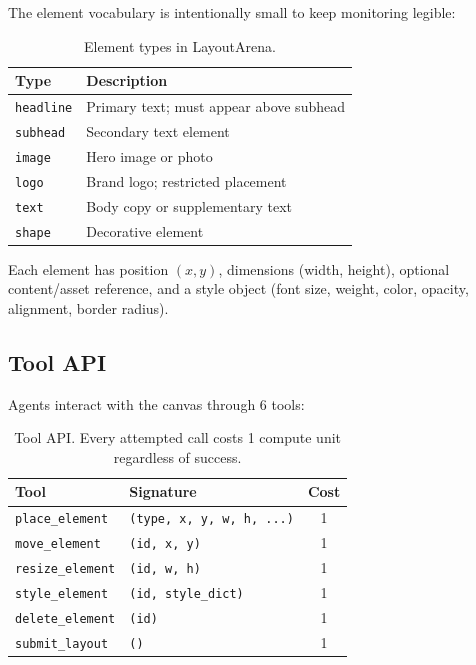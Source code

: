 \documentclass[10pt,twocolumn]{article}
\begin{document}
The element vocabulary is intentionally small to keep monitoring legible:

\begin{table}[H]
\centering
\small
\begin{tabular}{@{}ll@{}}
\toprule
\textbf{Type} & \textbf{Description} \\
\midrule
\texttt{headline} & Primary text; must appear above subhead \\
\texttt{subhead} & Secondary text element \\
\texttt{image} & Hero image or photo \\
\texttt{logo} & Brand logo; restricted placement \\
\texttt{text} & Body copy or supplementary text \\
\texttt{shape} & Decorative element \\
\bottomrule
\end{tabular}
\caption{Element types in LayoutArena.}
\label{tab:elements}
\end{table}

Each element has position $(x, y)$, dimensions (width, height), optional content/asset reference, and a style object (font size, weight, color, opacity, alignment, border radius).

\subsection{Tool API}

Agents interact with the canvas through 6 tools:

\begin{table}[H]
\centering
\small
\begin{tabular}{@{}llc@{}}
\toprule
\textbf{Tool} & \textbf{Signature} & \textbf{Cost} \\
\midrule
\texttt{place\_element} & \texttt{(type, x, y, w, h, ...)} & 1 \\
\texttt{move\_element} & \texttt{(id, x, y)} & 1 \\
\texttt{resize\_element} & \texttt{(id, w, h)} & 1 \\
\texttt{style\_element} & \texttt{(id, style\_dict)} & 1 \\
\texttt{delete\_element} & \texttt{(id)} & 1 \\
\texttt{submit\_layout} & \texttt{()} & 1 \\
\bottomrule
\end{tabular}
\caption{Tool API. Every attempted call costs 1 compute unit regardless of success.}
\label{tab:tools}
\end{table}
\end{document}
